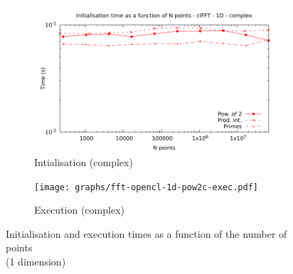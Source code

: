 \documentclass[12pt, a4paper]{article}
\begin{document}
\begin{figure}[H]
\begin{subfigure}{.5\textwidth}
\centering
\includegraphics[width=.9\linewidth]{graphs/fft-opencl-1d-pow2-c-init.pdf}
\caption{Intialisation (complex)}
\label{FFTCL1DCI}
\end{subfigure}%
\begin{subfigure}{.5\textwidth}
\centering
\texttt{[image: graphs/fft-opencl-1d-pow2c-exec.pdf]}
\caption{Execution (complex)}
\label{FFTCL1DCE}
\end{subfigure}
\caption{Initialisation and execution times as a function of the number of points\\(1 dimension)}
\label{FFTCL1D}
\end{figure}
\end{document}
